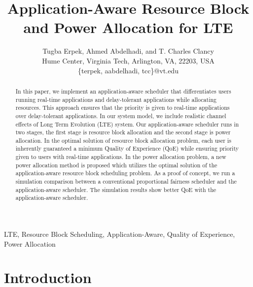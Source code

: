 \documentclass[journal]{IEEEtran} 				\IEEEoverridecommandlockouts 	\usepackage{amsmath,amssymb}
\begin{document}
\title{Application-Aware Resource Block and Power Allocation for LTE}
\author{Tugba Erpek, Ahmed Abdelhadi, and T. Charles Clancy \\
Hume Center, Virginia Tech, Arlington, VA, 22203, USA \\
\{terpek, aabdelhadi, tcc\}@vt.edu
}
\maketitle

\begin{abstract}
In this paper, we implement an application-aware scheduler that differentiates users running real-time applications and delay-tolerant applications while allocating resources. This approach ensures that the priority is given to real-time applications over delay-tolerant applications. In our system model, we include realistic channel effects of Long Term Evolution (LTE) system. Our application-aware scheduler runs in two stages, the first stage is resource block allocation and the second stage is power allocation.  In the optimal solution of resource block allocation problem, each user is inherently guaranteed a minimum Quality of Experience (QoE) while ensuring priority given to users with real-time applications. In the power allocation problem, a new power allocation method is proposed which utilizes the optimal solution of the application-aware resource block scheduling problem. As a proof of concept, we run a simulation  comparison between a conventional proportional fairness scheduler and the application-aware scheduler. The simulation results show better QoE with the application-aware scheduler. 
\end{abstract}

\begin{keywords}
LTE, Resource Block Scheduling, Application-Aware, Quality of Experience, Power Allocation
\end{keywords}
\providelength{\AxesLineWidth}       \setlength{\AxesLineWidth}{0.5pt}\providelength{\plotwidth}           \setlength{\plotwidth}{8cm}\providelength{\LineWidth}           \setlength{\LineWidth}{0.7pt}\providelength{\MarkerSize}          \setlength{\MarkerSize}{3pt}

\section{Introduction}\label{sec:intro}
\end{document}
